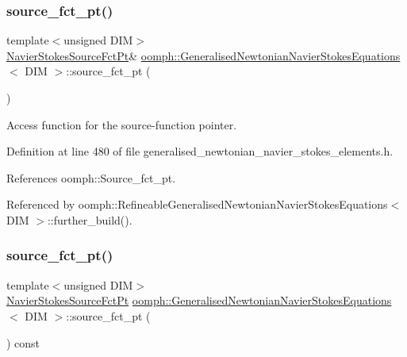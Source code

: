 \subsubsection{\texorpdfstring{source\+\_\+fct\+\_\+pt()}{source\_fct\_pt()}\hspace{0.1cm}{\footnotesize\ttfamily [1/2]}}
{\footnotesize\ttfamily template$<$unsigned D\+IM$>$ \\
\hyperlink{classoomph_1_1GeneralisedNewtonianNavierStokesEquations_a817ff3b87362e53bf1d0594723b84573}{Navier\+Stokes\+Source\+Fct\+Pt}\& \hyperlink{classoomph_1_1GeneralisedNewtonianNavierStokesEquations}{oomph\+::\+Generalised\+Newtonian\+Navier\+Stokes\+Equations}$<$ D\+IM $>$\+::source\+\_\+fct\+\_\+pt (\begin{DoxyParamCaption}{ }\end{DoxyParamCaption})\hspace{0.3cm}{\ttfamily [inline]}}



Access function for the source-\/function pointer. 



Definition at line 480 of file generalised\+\_\+newtonian\+\_\+navier\+\_\+stokes\+\_\+elements.\+h.



References oomph\+::\+Source\+\_\+fct\+\_\+pt.



Referenced by oomph\+::\+Refineable\+Generalised\+Newtonian\+Navier\+Stokes\+Equations$<$ D\+I\+M $>$\+::further\+\_\+build().

\mbox{\label{classoomph_1_1GeneralisedNewtonianNavierStokesEquations_a4eedc35ec748d295668845f68ed8ebec}} 
\subsubsection{\texorpdfstring{source\+\_\+fct\+\_\+pt()}{source\_fct\_pt()}\hspace{0.1cm}{\footnotesize\ttfamily [2/2]}}
{\footnotesize\ttfamily template$<$unsigned D\+IM$>$ \\
\hyperlink{classoomph_1_1GeneralisedNewtonianNavierStokesEquations_a817ff3b87362e53bf1d0594723b84573}{Navier\+Stokes\+Source\+Fct\+Pt} \hyperlink{classoomph_1_1GeneralisedNewtonianNavierStokesEquations}{oomph\+::\+Generalised\+Newtonian\+Navier\+Stokes\+Equations}$<$ D\+IM $>$\+::source\+\_\+fct\+\_\+pt (\begin{DoxyParamCaption}{ }\end{DoxyParamCaption}) const\hspace{0.3cm}{\ttfamily [inline]}}




